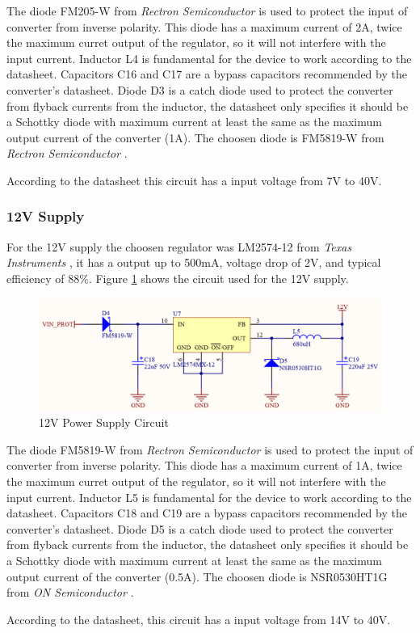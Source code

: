 			The diode FM205-W from \textit{Rectron Semiconductor} \cite{fm205-2-datasheet} is used to protect the input of converter from inverse polarity. This diode has a maximum current of 2A, twice the maximum curret output of the regulator, so it will not interfere with the input current. Inductor L4 is fundamental for the device to work according to the datasheet. Capacitors C16 and C17 are a bypass capacitors recommended by the converter's datasheet. Diode D3 is a catch diode used to protect the converter from flyback currents from the inductor, the datasheet only specifies it should be a Schottky diode with maximum current at least the same as the maximum output current of the converter (1A). The choosen diode is FM5819-W from \textit{Rectron Semiconductor} \cite{fm5819-w-datasheet}.
			\par
			According to the datasheet this circuit has a input voltage from 7V to 40V.

		\subsubsection{12V Supply}\label{sssec:12v-supply}
			For the 12V supply the choosen regulator was LM2574-12 from \textit{Texas Instruments} \cite{lm2574-12-datasheet}, it has a output up to 500mA, voltage drop of 2V, and typical efficiency of $88\%$. Figure \ref{fig:lm2574-12-circuit} shows the circuit used for the 12V supply.

			\begin{figure}[htbp]
				\centering
					\includegraphics[scale=1.8]{figuras/fig-lm2574-12-circuit.png}
				\caption{12V Power Supply Circuit\cite{lm2574-12-circuit}}
				\label{fig:lm2574-12-circuit}
			\end{figure}	

			The diode FM5819-W from \textit{Rectron Semiconductor} \cite{fm5819-w-datasheet} is used to protect the input of converter from inverse polarity. This diode has a maximum current of 1A, twice the maximum curret output of the regulator, so it will not interfere with the input current. Inductor L5 is fundamental for the device to work according to the datasheet. Capacitors C18 and C19 are a bypass capacitors recommended by the converter's datasheet. Diode D5 is a catch diode used to protect the converter from flyback currents from the inductor, the datasheet only specifies it should be a Schottky diode with maximum current at least the same as the maximum output current of the converter (0.5A). The choosen diode is NSR0530HT1G from \textit{ON Semiconductor} \cite{NSR0530HT1G-datasheet}.
			\par
			According to the datasheet, this circuit has a input voltage from 14V to 40V.	

